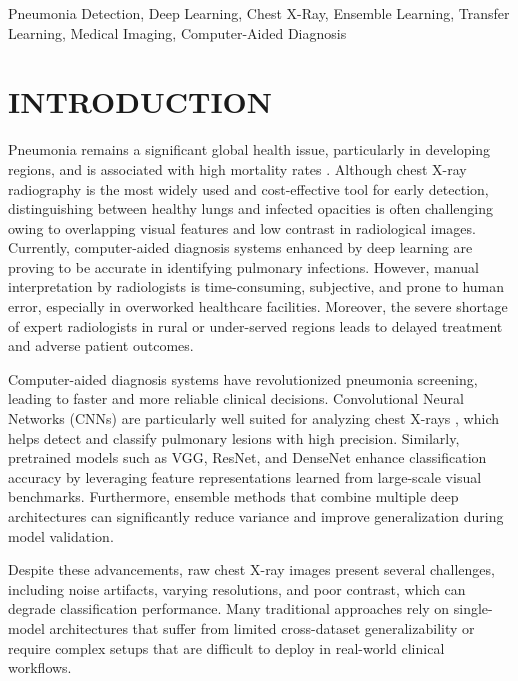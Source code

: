 \documentclass[conference]{IEEEtran}
\begin{document}
\begin{IEEEkeywords}
Pneumonia Detection, Deep Learning, Chest X-Ray, Ensemble Learning, Transfer Learning, Medical Imaging, Computer-Aided Diagnosis
\end{IEEEkeywords}

\section{INTRODUCTION}
\label{sec:intro}
Pneumonia remains a significant global health issue, particularly in developing regions, and is associated with high mortality rates \cite{who2025}. Although chest X-ray radiography is the most widely used and cost-effective tool for early detection, distinguishing between healthy lungs and infected opacities is often challenging owing to overlapping visual features and low contrast in radiological images. Currently, computer-aided diagnosis systems enhanced by deep learning are proving to be accurate in identifying pulmonary infections. However, manual interpretation by radiologists is time-consuming, subjective, and prone to human error, especially in overworked healthcare facilities. Moreover, the severe shortage of expert radiologists in rural or under-served regions leads to delayed treatment and adverse patient outcomes.

Computer-aided diagnosis systems have revolutionized pneumonia screening, leading to faster and more reliable clinical decisions. Convolutional Neural Networks (CNNs) are particularly well suited for analyzing chest X-rays \cite{kaggle2021}, which helps detect and classify pulmonary lesions with high precision. Similarly, pretrained models such as VGG, ResNet, and DenseNet enhance classification accuracy by leveraging feature representations learned from large-scale visual benchmarks. Furthermore, ensemble methods that combine multiple deep architectures can significantly reduce variance and improve generalization during model validation.

Despite these advancements, raw chest X-ray images present several challenges, including noise artifacts, varying resolutions, and poor contrast, which can degrade classification performance. Many traditional approaches rely on single-model architectures that suffer from limited cross-dataset generalizability or require complex setups that are difficult to deploy in real-world clinical workflows.
\end{document}
